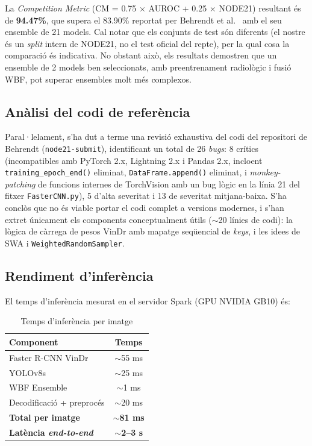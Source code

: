 La \textit{Competition Metric} (CM = 0.75 $\times$ AUROC + 0.25 $\times$ NODE21) resultant és de \textbf{94.47\%}, que supera el 83.90\% reportat per Behrendt et al.~\cite{behrendt2023node21} amb el seu ensemble de 21 models. Cal notar que els conjunts de test són diferents (el nostre és un \textit{split} intern de NODE21, no el test oficial del repte), per la qual cosa la comparació és indicativa. No obstant això, els resultats demostren que un ensemble de 2 models ben seleccionats, amb preentrenament radiològic i fusió WBF, pot superar ensembles molt més complexos.

\subsection{Anàlisi del codi de referència}

Paral·lelament, s'ha dut a terme una revisió exhaustiva del codi del repositori de Behrendt (\texttt{node21-submit}), identificant un total de 26 \textit{bugs}: 8 crítics (incompatibles amb PyTorch 2.x, Lightning 2.x i Pandas 2.x, incloent \texttt{training\_epoch\_end()} eliminat, \texttt{DataFrame.append()} eliminat, i \textit{monkey-patching} de funcions internes de TorchVision amb un bug lògic en la línia 21 del fitxer \texttt{FasterCNN.py}), 5 d'alta severitat i 13 de severitat mitjana-baixa. S'ha conclòs que no és viable portar el codi complet a versions modernes, i s'han extret únicament els components conceptualment útils ($\sim$20 línies de codi): la lògica de càrrega de pesos VinDr amb mapatge seqüencial de \textit{keys}, i les idees de SWA i \texttt{WeightedRandomSampler}.

\subsection{Rendiment d'inferència}

El temps d'inferència mesurat en el servidor Spark (GPU NVIDIA GB10) és:

\begin{table}[H]
\centering
\caption{Temps d'inferència per imatge}
\label{tab:inference}
\begin{tabular}{lc}
\toprule
\textbf{Component} & \textbf{Temps} \\
\midrule
Faster R-CNN VinDr & $\sim$55 ms \\
YOLOv8s & $\sim$25 ms \\
WBF Ensemble & $\sim$1 ms \\
Decodificació + preprocés & $\sim$20 ms \\
\midrule
\textbf{Total per imatge} & \textbf{$\sim$81 ms} \\
\textbf{Latència \textit{end-to-end}} & \textbf{$\sim$2--3 s} \\
\bottomrule
\end{tabular}
\end{table}

